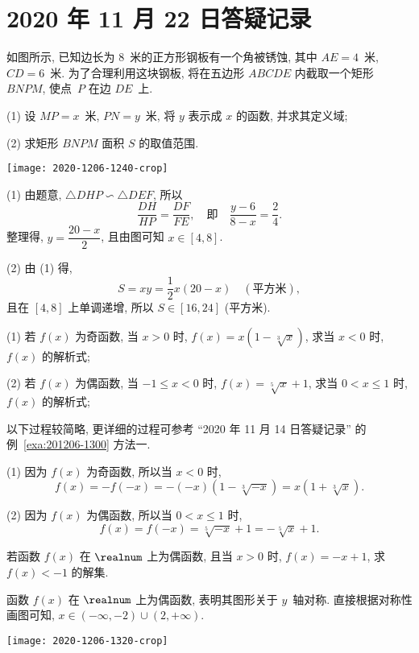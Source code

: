 \section{2020 年 11 月 22 日答疑记录}


\begin{example}
    如图所示, 已知边长为 $8$~米的正方形钢板有一个角被锈蚀, 其中 $AE=4$~米, $CD=6$~米. 为了合理利用这块钢板, 将在五边形 $ABCDE$ 内截取一个矩形 $BNPM$, 使点~$P$ 在边 $DE$~上.
    
    (1) 设 $MP=x$~米, $PN=y$~米, 将 $y$ 表示成 $x$ 的函数, 并求其定义域;
    
    (2) 求矩形 $BNPM$ 面积 $S$ 的取值范围.
    
    \begin{center}
        \texttt{[image: 2020-1206-1240-crop]}
    \end{center}
    
\end{example}
\begin{solution}
    (1) 由题意, $\triangle DHP\backsim \triangle DEF$, 所以
    \[\frac{DH}{HP}= \frac{DF}{FE},\quad\text{即}\quad
        \frac{y-6}{8-x}= \frac{2}{4}.\]
    整理得, $y=\dfrac{20-x}2$, 且由图可知 $x\in[4,8]$.
    
    (2) 由 (1) 得, 
    \[S= xy= \frac12 x(20-x)\quad (\text{平方米}),\]
    且在 $[4,8]$ 上单调递增, 所以 $S\in[16,24]$ (平方米).
\end{solution}

\begin{example}
    (1) 若 $f(x)$ 为奇函数, 当 $x>0$ 时, $f(x)=x(1-\sqrt[3]{x})$, 求当 $x<0$ 时, $f(x)$ 的解析式;
    
    (2) 若 $f(x)$ 为偶函数, 当 $-1\leqslant x<0$ 时, $f(x)=\sqrt[5]{x}+1$, 求当 $0<x\leqslant 1$ 时, $f(x)$ 的解析式;
\end{example}
\begin{solution}
    以下过程较简略, 更详细的过程可参考 ``2020 年 11 月 14 日答疑记录'' 的例~\ref{exa:201206-1300} 方法一.
    
    (1) 因为 $f(x)$ 为奇函数, 所以当 $x<0$ 时,
    \[f(x)= -f(-x)= -(-x)(1-\sqrt[3]{-x})= x(1+\sqrt[3]{x}).\]
    
    (2) 因为 $f(x)$ 为偶函数, 所以当 $0<x\leqslant 1$ 时,
    \[f(x)= f(-x)= \sqrt[5]{-x}+1= -\sqrt[5]{x}+1.\]
\end{solution}

\begin{example}
    若函数 $f(x)$ 在 $\realnum$ 上为偶函数, 且当 $x>0$ 时, $f(x)=-x+1$, 求 $f(x)<-1$ 的解集.
\end{example}
\begin{solution}
    函数 $f(x)$ 在 $\realnum$ 上为偶函数, 表明其图形关于 $y$~轴对称. 直接根据对称性画图可知, $x\in(-\infty,-2)\cup(2,+\infty)$.
    
    \begin{center}
        \texttt{[image: 2020-1206-1320-crop]}
    \end{center}
\end{solution}

